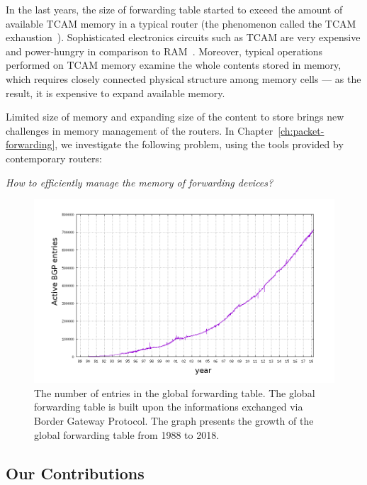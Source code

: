 In the last years, the size of forwarding table started to exceed the amount of available TCAM memory in a typical router (the phenomenon called the TCAM exhaustion~\cite{tcam-exhaust}).
Sophisticated electronics circuits such as TCAM are very expensive and power-hungry in comparison to RAM~\cite{tcam-expensive}.
Moreover, typical operations performed on TCAM memory examine the whole contents stored in memory, which requires closely connected physical structure among memory cells --- as the result, it is expensive to expand available memory.

Limited size of memory and expanding size of the content to store brings new challenges in memory management of the routers.
In Chapter~\ref{ch:packet-forwarding}, we investigate the following problem, using the tools provided by contemporary routers:
\begin{center}
  \emph{How to efficiently manage the memory of forwarding devices?}
\end{center}

\begin{figure}[ht]
\centering
\includegraphics[width=0.79\columnwidth]{figs/bgp-entries.png}
\caption{The number of entries in the global forwarding table. The global forwarding table is built upon the informations exchanged via Border Gateway Protocol. The graph presents the growth of the global forwarding table from 1988 to 2018.}\label{fig:bgp-entries}
\end{figure}


\subsection{Our Contributions}

